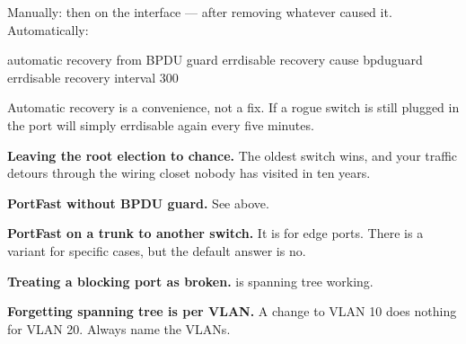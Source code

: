 \begin{conceptbox}
Manually:  then  on the interface --- after
removing whatever caused it. Automatically:

\begin{config}{automatic recovery from BPDU guard}
errdisable recovery cause bpduguard
errdisable recovery interval 300
\end{config}

Automatic recovery is a convenience, not a fix. If a rogue switch is still
plugged in the port will simply errdisable again every five minutes.
\end{conceptbox}

\begin{pitfall}
\begin{tight}
  \item \textbf{Leaving the root election to chance.} The oldest switch wins, and
        your traffic detours through the wiring closet nobody has visited in ten
        years.
  \item \textbf{PortFast without BPDU guard.} See above.
  \item \textbf{PortFast on a trunk to another switch.} It is for edge ports.
        There is a  variant for specific cases, but the
        default answer is no.
  \item \textbf{Treating a blocking port as broken.}  is spanning
        tree working.
  \item \textbf{Forgetting spanning tree is per VLAN.} A change to VLAN 10 does
        nothing for VLAN 20. Always name the VLANs.
\end{tight}
\end{pitfall}

